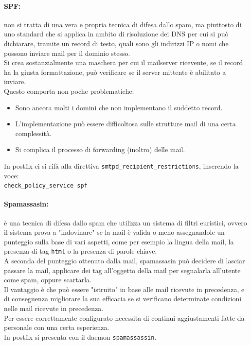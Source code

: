 \documentclass[a4paper]{report}
\newcommand\tab[1][1cm]{\hspace*{#1}}
\begin{document}
\paragraph{SPF:} non si tratta di una vera e propria tecnica di difesa dallo spam, ma piuttosto di uno standard che si applica in ambito di risoluzione dei DNS per cui si può dichiarare, tramite un record di testo, quali sono gli indirizzi IP o nomi che possono inviare mail per il dominio stesso.\\
Si crea sostanzialmente una maschera per cui il mailserver ricevente, se il record ha la giusta formattazione, può verificare se il server mittente è abilitato a inviare.\\
Questo comporta non poche problematiche:
\begin{itemize}
\item Sono ancora molti i domini che non implementano il suddetto record.
\item L'implementazione può essere difficoltosa sulle strutture mail di una certa complessità.
\item Si complica il processo di forwarding (inoltro) delle mail.
\end{itemize}
In postfix ci si rifà alla direttiva \texttt{smtpd\_recipient\_restrictions}, inserendo la voce:\\
\tab\texttt{check\_policy\_service spf}
\paragraph{Spamassasin:} è una tecnica di difesa dallo spam che utilizza un sistema di filtri euristici, ovvero il sistema prova a "indovinare" se la mail è valida o meno assegnandole un punteggio sulla base di vari aspetti, come per esempio la lingua della mail, la presenza di tag \texttt{html} o la presenza di parole chiave.\\
A seconda del punteggio ottenuto dalla mail, spamassasin può decidere di lasciar passare la mail, applicare dei tag all'oggetto della mail per segnalarla all'utente come spam, oppure scartarla.\\
Il vantaggio è che può essere "istruito" in base alle mail ricevute in precedenza, e di conseguenza migliorare la sua efficacia se si verificano determinate condizioni nelle mail ricevute in precedenza.\\
Per essere correttamente configurato necessita di continui aggiustamenti fatte da personale con una certa esperienza.\\
In postfix si presenta con il daemon \texttt{spamassassin}.
\end{document}
